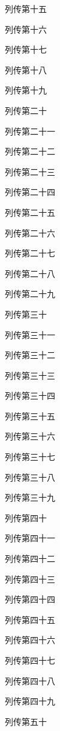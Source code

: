 \documentclass[12pt,UTF8]{ctexbook}
\begin{document}
列传第十五

列传第十六

列传第十七

列传第十八

列传第十九

列传第二十

列传第二十一

列传第二十二

列传第二十三

列传第二十四

列传第二十五

列传第二十六

列传第二十七

列传第二十八

列传第二十九

列传第三十

列传第三十一

列传第三十二

列传第三十三

列传第三十四

列传第三十五

列传第三十六

列传第三十七

列传第三十八

列传第三十九

列传第四十

列传第四十一

列传第四十二

列传第四十三

列传第四十四

列传第四十五

列传第四十六

列传第四十七

列传第四十八

列传第四十九

列传第五十

\backmatter
\end{document}
